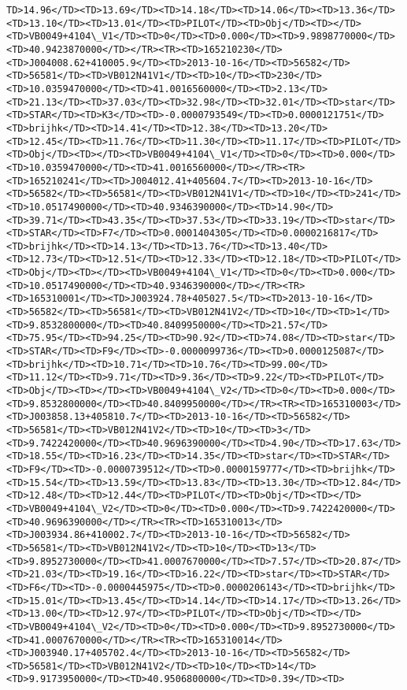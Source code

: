 \documentclass[11pt]{article}
\begin{document}
\begin{Verbatim}[commandchars=\\\{\}]
TD>14.96</TD><TD>13.69</TD><TD>14.18</TD><TD>14.06</TD><TD>13.36</TD><TD>13.10</TD><TD>13.01</TD><TD>PILOT</TD><TD>Obj</TD><TD></TD><TD>VB0049+4104\_V1</TD><TD>0</TD><TD>0.000</TD><TD>9.9898770000</TD><TD>40.9423870000</TD></TR><TR><TD>165210230</TD><TD>J004008.62+410005.9</TD><TD>2013-10-16</TD><TD>56582</TD><TD>56581</TD><TD>VB012N41V1</TD><TD>10</TD><TD>230</TD><TD>10.0359470000</TD><TD>41.0016560000</TD><TD>2.13</TD><TD>21.13</TD><TD>37.03</TD><TD>32.98</TD><TD>32.01</TD><TD>star</TD><TD>STAR</TD><TD>K3</TD><TD>-0.0000793549</TD><TD>0.0000121751</TD><TD>brijhk</TD><TD>14.41</TD><TD>12.38</TD><TD>13.20</TD><TD>12.45</TD><TD>11.76</TD><TD>11.30</TD><TD>11.17</TD><TD>PILOT</TD><TD>Obj</TD><TD></TD><TD>VB0049+4104\_V1</TD><TD>0</TD><TD>0.000</TD><TD>10.0359470000</TD><TD>41.0016560000</TD></TR><TR><TD>165210241</TD><TD>J004012.41+405604.7</TD><TD>2013-10-16</TD><TD>56582</TD><TD>56581</TD><TD>VB012N41V1</TD><TD>10</TD><TD>241</TD><TD>10.0517490000</TD><TD>40.9346390000</TD><TD>14.90</TD><TD>39.71</TD><TD>43.35</TD><TD>37.53</TD><TD>33.19</TD><TD>star</TD><TD>STAR</TD><TD>F7</TD><TD>0.0001404305</TD><TD>0.0000216817</TD><TD>brijhk</TD><TD>14.13</TD><TD>13.76</TD><TD>13.40</TD><TD>12.73</TD><TD>12.51</TD><TD>12.33</TD><TD>12.18</TD><TD>PILOT</TD><TD>Obj</TD><TD></TD><TD>VB0049+4104\_V1</TD><TD>0</TD><TD>0.000</TD><TD>10.0517490000</TD><TD>40.9346390000</TD></TR><TR><TD>165310001</TD><TD>J003924.78+405027.5</TD><TD>2013-10-16</TD><TD>56582</TD><TD>56581</TD><TD>VB012N41V2</TD><TD>10</TD><TD>1</TD><TD>9.8532800000</TD><TD>40.8409950000</TD><TD>21.57</TD><TD>75.95</TD><TD>94.25</TD><TD>90.92</TD><TD>74.08</TD><TD>star</TD><TD>STAR</TD><TD>F9</TD><TD>-0.0000099736</TD><TD>0.0000125087</TD><TD>brijhk</TD><TD>10.71</TD><TD>10.76</TD><TD>99.00</TD><TD>11.12</TD><TD>9.71</TD><TD>9.36</TD><TD>9.22</TD><TD>PILOT</TD><TD>Obj</TD><TD></TD><TD>VB0049+4104\_V2</TD><TD>0</TD><TD>0.000</TD><TD>9.8532800000</TD><TD>40.8409950000</TD></TR><TR><TD>165310003</TD><TD>J003858.13+405810.7</TD><TD>2013-10-16</TD><TD>56582</TD><TD>56581</TD><TD>VB012N41V2</TD><TD>10</TD><TD>3</TD><TD>9.7422420000</TD><TD>40.9696390000</TD><TD>4.90</TD><TD>17.63</TD><TD>18.55</TD><TD>16.23</TD><TD>14.35</TD><TD>star</TD><TD>STAR</TD><TD>F9</TD><TD>-0.0000739512</TD><TD>0.0000159777</TD><TD>brijhk</TD><TD>15.54</TD><TD>13.59</TD><TD>13.83</TD><TD>13.30</TD><TD>12.84</TD><TD>12.48</TD><TD>12.44</TD><TD>PILOT</TD><TD>Obj</TD><TD></TD><TD>VB0049+4104\_V2</TD><TD>0</TD><TD>0.000</TD><TD>9.7422420000</TD><TD>40.9696390000</TD></TR><TR><TD>165310013</TD><TD>J003934.86+410002.7</TD><TD>2013-10-16</TD><TD>56582</TD><TD>56581</TD><TD>VB012N41V2</TD><TD>10</TD><TD>13</TD><TD>9.8952730000</TD><TD>41.0007670000</TD><TD>7.57</TD><TD>20.87</TD><TD>21.03</TD><TD>19.16</TD><TD>16.22</TD><TD>star</TD><TD>STAR</TD><TD>F6</TD><TD>-0.0000445975</TD><TD>0.0000206143</TD><TD>brijhk</TD><TD>15.01</TD><TD>13.45</TD><TD>14.14</TD><TD>14.17</TD><TD>13.26</TD><TD>13.00</TD><TD>12.97</TD><TD>PILOT</TD><TD>Obj</TD><TD></TD><TD>VB0049+4104\_V2</TD><TD>0</TD><TD>0.000</TD><TD>9.8952730000</TD><TD>41.0007670000</TD></TR><TR><TD>165310014</TD><TD>J003940.17+405702.4</TD><TD>2013-10-16</TD><TD>56582</TD><TD>56581</TD><TD>VB012N41V2</TD><TD>10</TD><TD>14</TD><TD>9.9173950000</TD><TD>40.9506800000</TD><TD>0.39</TD><TD>
\end{Verbatim}
\end{document}
